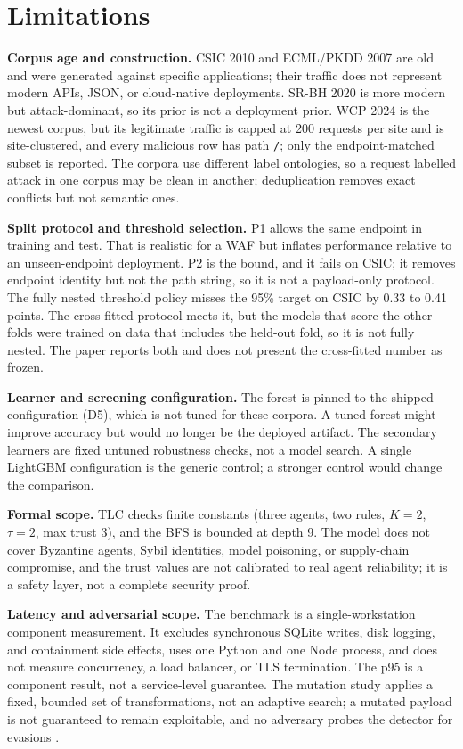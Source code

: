 \documentclass[preprint,11pt]{elsarticle}
\begin{document}
\section{Limitations}\label{limitations}

\textbf{Corpus age and construction.} CSIC 2010 and ECML/PKDD 2007 are
old and were generated against specific applications; their traffic does
not represent modern APIs, JSON, or cloud-native deployments. SR-BH 2020
is more modern but attack-dominant, so its prior is not a deployment
prior. WCP 2024 is the newest corpus, but its legitimate traffic is
capped at 200 requests per site and is site-clustered, and every
malicious row has path \texttt{/\allowbreak{}}; only the endpoint-matched subset is
reported. The corpora use different label ontologies, so a request
labelled attack in one corpus may be clean in another; deduplication
removes exact conflicts but not semantic ones.

\textbf{Split protocol and threshold selection.} P1 allows the same
endpoint in training and test. That is realistic for a WAF but inflates
performance relative to an unseen-endpoint deployment. P2 is the bound,
and it fails on CSIC; it removes endpoint identity but not the path
string, so it is not a payload-only protocol. The fully nested threshold
policy misses the 95\% target on CSIC by 0.33 to 0.41 points. The
cross-fitted protocol meets it, but the models that score the other
folds were trained on data that includes the held-out fold, so it is not
fully nested. The paper reports both and does not present the
cross-fitted number as frozen.

\textbf{Learner and screening configuration.} The forest is pinned to
the shipped configuration (D5), which is not tuned for these corpora. A
tuned forest might improve accuracy but would no longer be the deployed
artifact. The secondary learners are fixed untuned robustness checks,
not a model search. A single LightGBM configuration is the generic
control; a stronger control would change the comparison.

\textbf{Formal scope.} TLC checks finite constants (three agents, two
rules, \(K=2\), \(\tau=2\), max trust 3), and the BFS is bounded at
depth 9. The model does not cover Byzantine agents, Sybil identities,
model poisoning, or supply-chain compromise, and the trust values are
not calibrated to real agent reliability; it is a safety layer, not a
complete security proof.

\textbf{Latency and adversarial scope.} The benchmark is a
single-workstation component measurement. It excludes synchronous SQLite
writes, disk logging, and containment side effects, uses one Python and
one Node process, and does not measure concurrency, a load balancer, or
TLS termination. The p95 is a component result, not a service-level
guarantee. The mutation study applies a fixed, bounded set of
transformations, not an adaptive search; a mutated payload is not
guaranteed to remain exploitable, and no adversary probes the detector
for evasions \citep{biggio2018wild}.
\end{document}
